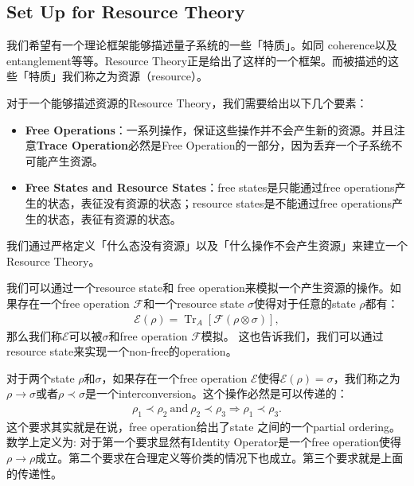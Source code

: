\subsection{Set Up for Resource Theory}
我们希望有一个理论框架能够描述量子系统的一些「特质」。如同 coherence以及entanglement等等。Resource
Theory正是给出了这样的一个框架。而被描述的这些「特质」我们称之为资源（resource）。

\bigskip
{}

对于一个能够描述资源的Resource Theory，我们需要给出以下几个要素：
\begin{itemize}
  \item \textbf{Free
    Operations}：一系列操作，保证这些操作并不会产生新的资源。并且注意\textbf{Trace
    Operation}必然是Free Operation的一部分，因为丢弃一个子系统不可能产生资源。
  \item \textbf{Free States and Resource States}：free states是只能通过free
    operations产生的状态，表征没有资源的状态；resource states是不能通过free operations产生的状态，表征有资源的状态。
\end{itemize}
我们通过严格定义「什么态没有资源」以及「什么操作不会产生资源」来建立一个Resource Theory。

\bigskip
{}

我们可以通过一个resource state和 free operation来模拟一个产生资源的操作。如果存在一个free
operation $ \mathcal{F} $和一个resource state $ \sigma $使得对于任意的state $ \rho $都有：
\begin{align}
  \mathcal{E}(\rho) = \operatorname{Tr}_{A}\left[\mathcal{F}(\rho
  \otimes \sigma)\right],
\end{align}
那么我们称$ \mathcal{E} $可以被$ \sigma $和free operation $ \mathcal{F} $模拟。
这也告诉我们，我们可以通过resource state来实现一个non-free的operation。

\bigskip
{}

对于两个state $ \rho $和$ \sigma $，如果存在一个free operation $ \mathcal{E} $使得$
\mathcal{E}(\rho) = \sigma $，我们称之为$ \rho \to \sigma $或者$ \rho \prec
\sigma $是一个interconversion。这个操作必然是可以传递的：
\begin{align}
  \rho_{1}\prec\rho_{2}\mathrm{~and~}\rho_{2}\prec\rho_{3}\Longrightarrow\rho_{1}\prec\rho_{3}.
\end{align}
这个要求其实就是在说，free operation给出了state 之间的一个partial ordering。数学上定义为:
对于第一个要求显然有Identity Operator是一个free operation使得$ \rho \to \rho
$成立。第二个要求在合理定义等价类的情况下也成立。第三个要求就是上面的传递性。

